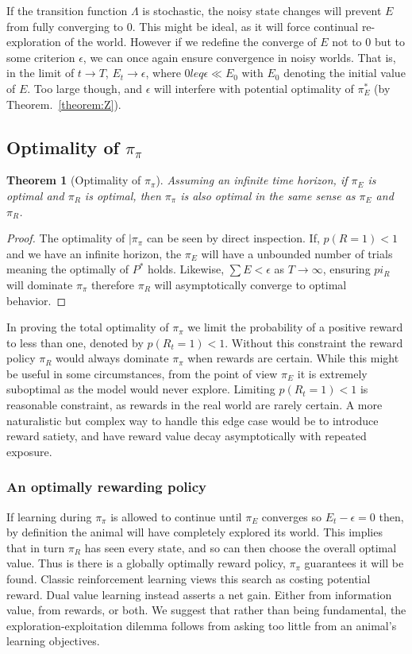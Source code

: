 \documentclass[9pt,twocolumn,twoside]{pnas-new}
\newtheorem{theorem}{Theorem}
\begin{document}
If the transition function $\Lambda$ is stochastic, the noisy state changes will prevent $E$ from fully converging to 0. This might be ideal, as it will force continual re-exploration of the world. However if we redefine the converge of $E$ not to 0 but to some criterion $\epsilon$, we can once again ensure convergence in noisy worlds. That is, in the limit of $t \rightarrow T$, $E_t \rightarrow \epsilon$, where $0 leq \epsilon \ll E_0$ with $E_0$ denoting the initial value of $E$. Too large though, and $\epsilon$ will interfere with potential optimality of $\pi^*_E$ (by Theorem.~\ref{theorem:Z}). 

\subsection*{Optimality of $\pi_{\pi}$}

\begin{theorem}[Optimality of $\pi_{\pi}$] \label{theorem:meta}
    Assuming an infinite time horizon, if $\pi_E$ is optimal and $\pi_R$ is optimal, then $\pi_{\pi}$ is also optimal in the same sense as $\pi_E$ and $\pi_R$.
\end{theorem}
\begin{proof}
    The optimality of $|\pi_{\pi}$ can be seen by direct inspection. If, $p(R = 1) < 1$ and we have an infinite horizon, the $\pi_E$ will have a unbounded number of trials meaning the optimally of $P^*$ holds. Likewise, $\sum E < \epsilon$ as $T \rightarrow \infty$, ensuring $pi_R$ will dominate $\pi_{\pi}$ therefore $\pi_R$ will asymptotically converge to optimal behavior.
\end{proof}

In proving the total optimality of $\pi_{\pi}$ we limit the probability of a positive reward to less than one, denoted by $p(R_t = 1) < 1$. Without this constraint the reward policy $\pi_R$ would always dominate $\pi_{\pi}$ when rewards are certain. While this might be useful in some circumstances, from the point of view $\pi_E$ it is extremely suboptimal as the model would never explore. Limiting $p(R_t = 1) < 1$ is reasonable constraint, as rewards in the real world are rarely certain. A more naturalistic but complex way to handle this edge case would be to introduce reward satiety, and have reward value decay asymptotically with repeated exposure. 

\subsubsection*{An optimally rewarding policy}
If learning during $\pi_{\pi}$ is allowed to continue until $\pi_E$ converges so $E_t - \epsilon = 0$ then, by definition the animal will have completely explored its world. This implies that in turn $\pi_R$ has seen every state, and so can then choose the overall optimal value. Thus is there is a globally optimally reward policy, $\pi_{\pi}$ guarantees it will be found. Classic reinforcement learning views this search as costing potential reward. Dual value learning instead asserts a net gain. Either from information value, from rewards, or both. We suggest that rather than being fundamental, the exploration-exploitation dilemma follows from asking too little from an animal's learning objectives.
\end{document}
